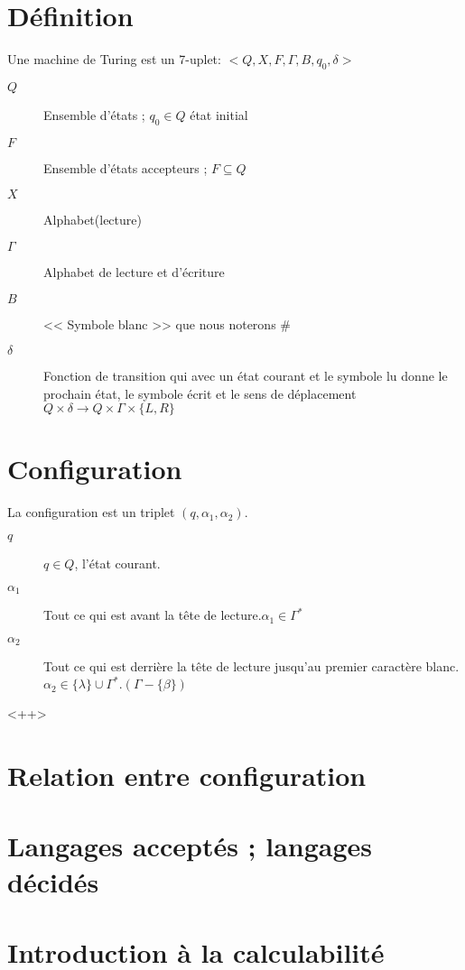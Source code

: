 \section{Définition}
Une machine de Turing est un 7-uplet: $<Q,X,F,\Gamma, B, q_0, \delta>$
\begin{description}
	\item[$Q$]Ensemble d'états ; $q_0 \in Q$ état initial
	\item[$F$] Ensemble d'états accepteurs ; $F \subseteq Q$
	\item[$X$] Alphabet(lecture)
	\item[$\Gamma$] Alphabet de lecture et d'écriture
	\item[$B$] << Symbole blanc >> que nous noterons \#
	\item[$\delta$] Fonction de transition qui avec un état courant et le symbole lu donne le prochain état, le symbole écrit et le sens de déplacement
		$Q \times \delta \rightarrow Q \times \Gamma \times \{L,R\}$
\end{description}
\section{Configuration}
La configuration est un triplet $(q, \alpha_1, \alpha_2)$.
\begin{description}
	\item[$q$] $q \in Q$, l'état courant.
	\item[$\alpha_1$]Tout ce qui est avant la tête de lecture.$\alpha_1 \in \Gamma^*$
	\item[$\alpha_2$] Tout ce qui est derrière la tête de lecture jusqu'au premier caractère blanc. 
		$\alpha_2 \in\{\lambda\} \cup \Gamma^*.(\Gamma -\{\beta\})$
\end{description}<++>
\section{Relation entre configuration}
\section{Langages acceptés ; langages décidés}
\section{Introduction à la calculabilité}
